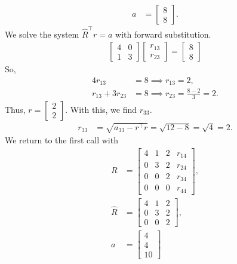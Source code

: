 \documentclass{report}
\begin{document}
\begin{remark}
\begin{align*}
        a &= \begin{bmatrix} 8 \\ 8 \end{bmatrix}
    .\end{align*}
    We solve the system $\hat{R}^{\top}r = a $ with forward substitution.
    \begin{align*}
        \begin{bmatrix}
            4 & 0 \\
            1 & 3
        \end{bmatrix}
        \begin{bmatrix}
            r_{13} \\ r_{23}
        \end{bmatrix}
         = 
         \begin{bmatrix}
             8 \\ 8
         \end{bmatrix}
    \end{align*}
    So,
    \begin{align*}
        4r_{13} &= 8 \implies r_{13} = 2, \\
        r_{13} + 3r_{23} &= 8 \implies r_{23} = \frac{8-2}{3} = 2
    .\end{align*}
    Thus, $r = \begin{bmatrix} 2 \\ 2 \end{bmatrix} $. With this, we find $r_{33}$.
    \begin{align*}
        r_{33} &= \sqrt{a_{33} - r^{\top}r} = \sqrt{12 - 8} = \sqrt{4} = 2 
    .\end{align*}
    We return to the first call with
    \begin{align*}
        R &= \begin{bmatrix} 4 & 1 & 2 & r_{14} \\ 0 & 3 & 2 & r_{24} \\ 0 & 0 & 2 & r_{34} \\ 0 & 0 & 0 & r_{44} \end{bmatrix}, \\
        \hat{R} &= \begin{bmatrix} 4 & 1 & 2 \\ 0 & 3 & 2 \\ 0 & 0 & 2 \end{bmatrix}, \\
        a &= \begin{bmatrix} 4 \\ 4 \\ 10 \end{bmatrix}

\end{align*}
\end{remark}
\end{document}
